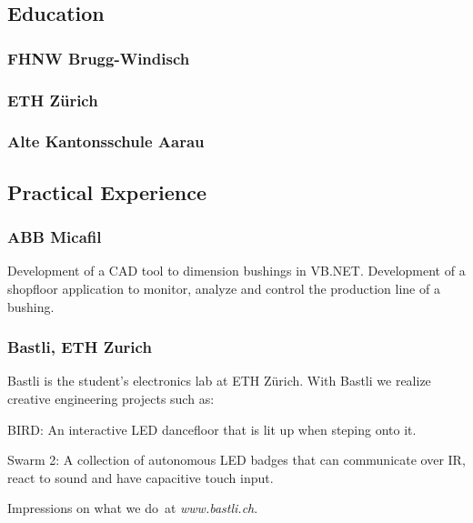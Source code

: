 \documentclass[]{resume}
\begin{document}
\begin{timeline}


\subsection{Education}

\subsubsection{FHNW Brugg-Windisch}
\sectionsep

\subsubsection{ETH Zürich}
\sectionsep

\subsubsection{Alte Kantonsschule Aarau}
\sectionsep


\subsection{Practical Experience}

\subsubsection{ABB Micafil}
Development of a CAD tool to dimension bushings in VB.NET.
Development of a shopfloor application to monitor, analyze and control the production line of a bushing.
\sectionsep

\subsubsection{Bastli, ETH Zurich}
Bastli is the student's electronics lab at ETH Zürich.
With Bastli we realize creative engineering projects such as:
\vspace{\topsep} %
\begin{tightemize}
\item BIRD: An interactive LED dancefloor that is lit up when steping onto it. 
\item Swarm 2: A collection of autonomous LED badges that can communicate over IR, react to sound and have capacitive touch input.
\end{tightemize}
Impressions on what we do at \textit{www.bastli.ch}.
\sectionsep


\end{timeline}
\end{document}
